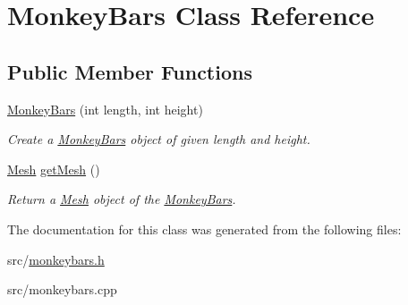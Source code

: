 \hypertarget{classMonkeyBars}{}\section{Monkey\+Bars Class Reference}
\label{classMonkeyBars}
\subsection*{Public Member Functions}
\begin{DoxyCompactItemize}
\item 
\hyperlink{classMonkeyBars_a9e3ed36c63b0a8cc7becd14edc7514f3}{Monkey\+Bars} (int length, int height)\hypertarget{classMonkeyBars_a9e3ed36c63b0a8cc7becd14edc7514f3}{}\label{classMonkeyBars_a9e3ed36c63b0a8cc7becd14edc7514f3}

\begin{DoxyCompactList}\small\item\em Create a \hyperlink{classMonkeyBars}{Monkey\+Bars} object of given length and height. \end{DoxyCompactList}\item 
\hyperlink{classMesh}{Mesh} \hyperlink{classMonkeyBars_ac647ae1a38c7d850cef78de246bab47e}{get\+Mesh} ()\hypertarget{classMonkeyBars_ac647ae1a38c7d850cef78de246bab47e}{}\label{classMonkeyBars_ac647ae1a38c7d850cef78de246bab47e}

\begin{DoxyCompactList}\small\item\em Return a \hyperlink{classMesh}{Mesh} object of the \hyperlink{classMonkeyBars}{Monkey\+Bars}. \end{DoxyCompactList}\end{DoxyCompactItemize}


The documentation for this class was generated from the following files\+:\begin{DoxyCompactItemize}
\item 
src/\hyperlink{monkeybars_8h}{monkeybars.\+h}\item 
src/monkeybars.\+cpp\end{DoxyCompactItemize}
